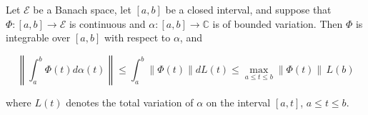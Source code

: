 Let $\mathcal{E}$ be a Banach space, let $[a, b]$ be a closed interval, and suppose that $\Phi: [a, b] \to \mathcal{E}$ is continuous and $\alpha: [a, b] \to \mathbb{C}$ is of bounded variation. Then $\Phi$ is integrable over $[a, b]$ with respect to $\alpha$, and

$$\left\| \int_a^b \Phi(t) d\alpha(t) \right\| \leq \int_a^b \| \Phi(t) \| dL(t) \leq \max_{a \leq t \leq b} \| \Phi(t) \| \, L(b)$$

where $L(t)$ denotes the total variation of $\alpha$ on the interval $[a, t]$, $a \leq t \leq b$.
